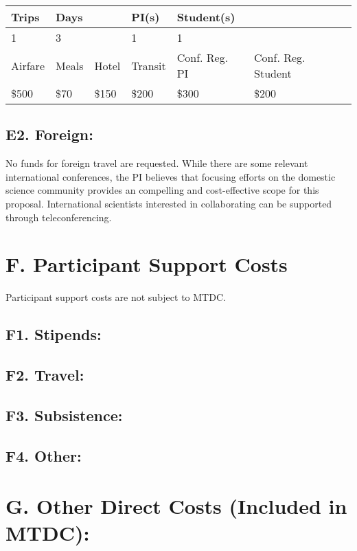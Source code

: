 \documentclass[11pt,oneside]{memoir}
\begin{document}
    \begin{tabular}{ llllll } 
     Trips & Days & & PI(s) & Student(s) & \\
     \hline
     1 & 3 & & 1 & 1 &  \\ 
     Airfare & Meals & Hotel & Transit & Conf. Reg. PI & Conf. Reg. Student\\ 
     \hline
     \$500 & \$70 & \$150 & \$200 & \$300 & \$200 \\ 
   \end{tabular}
    
    

\subsection{E2. Foreign:}
No funds for foreign travel are requested.  While there are some relevant international conferences, the PI believes that focusing efforts on the domestic science community provides an compelling and cost-effective scope for this proposal.  International scientists interested in collaborating can be supported through teleconferencing.


\section*{F. Participant Support Costs} 
Participant support costs are not subject to MTDC.

\subsection*{F1. Stipends:}

\subsection*{F2. Travel:}

\subsection*{F3. Subsistence:}

\subsection*{F4. Other:}

\section*{G. Other Direct Costs (Included in MTDC):}
\end{document}
